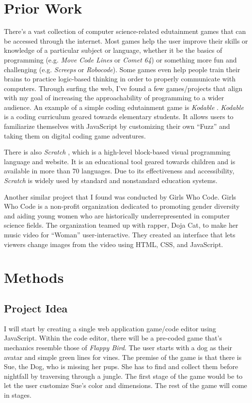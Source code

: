 \documentclass[10pt,twocolumn]{article}
\begin{document}
\section{Prior Work}
There’s a vast collection of computer science-related edutainment games that can be accessed through the internet. Most games help the user improve their skills or knowledge of a particular subject or language, whether it be the basics of programming (e.g. \textit{Move Code Lines} or \textit{Comet 64}) or something more fun and challenging (e.g. \textit{Screeps} or \textit{Robocode}). Some games even help people train their brains to practice logic-based thinking in order to properly communicate with computers. 
Through surfing the web, I’ve found a few games/projects that align with my goal of increasing the approachability of programming to a wider audience. An example of a simple coding edutainment game is \textit{Kodable} \cite{mattingly}. \textit{Kodable} is a coding curriculum geared towards elementary students. It allows users to familiarize themselves with JavaScript by customizing their own “Fuzz” and taking them on digital coding game adventures. 

There is also \textit{Scratch} , which is a high-level block-based visual programming language and website. It is an educational tool geared towards children and is available in more than 70 languages. Due to its effectiveness and accessibility, \textit{Scratch} is widely used by standard and nonstandard education systems.

Another similar project that I found was conducted by Girls Who Code. Girls Who Code is a non-profit organization dedicated to promoting gender diversity and aiding young women who are historically underrepresented in computer science fields. The organization teamed up with rapper, Doja Cat, to make her music video for “Woman” user-interactive. They created an interface that lets viewers change images from the video using HTML, CSS, and JavaScript. 


\section{Methods}

\subsection{Project Idea}
I will start by creating a single web application game/code editor using JavaScript. Within the code editor, there will be a pre-coded game that’s mechanics resemble those of \textit{Flappy Bird}. \cite{Nguyen} The user starts with a dog as their avatar and simple green lines for vines.
The premise of the game is that there is Sue, the Dog, who is missing her pups. She has to find and collect them before nightfall by traversing through a jungle. The first stage of the game would be to let the user customize Sue's color and dimensions. The rest of the game will come in stages. 
\end{document}
